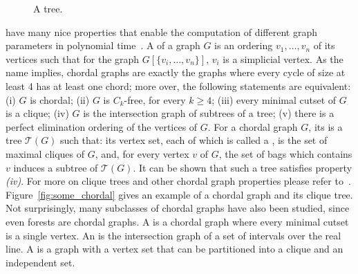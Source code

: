 \begin{figure}
    \centering
    \caption{A tree.}
    \label{fig:some_tree}
\end{figure}


 have many nice properties that enable the computation of different graph parameters in polynomial time~\citep{golumbic}. A  of a graph $G$ is an ordering $v_1, \dots, v_n$ of its vertices such that for the graph $G[\{v_i, \dots, v_n\}]$, $v_i$ is a simplicial vertex. As the name implies, chordal graphs are exactly the graphs where every cycle of size at least 4 has at least one chord; more over, the following statements are equivalent: (i) $G$ is chordal; (ii) $G$ is $C_k$-free, for every $k \geq 4$; (iii) every minimal cutset of $G$ is a clique; (iv) $G$ is the intersection graph of subtrees of a tree; (v) there is a perfect elimination ordering of the vertices of $G$.
For a chordal graph $G$, its  is a tree $\mathcal{T}(G)$ such that: its vertex set, each of which is called a , is the set of maximal cliques of $G$, and, for every vertex $v$ of $G$, the set of bags which contains $v$ induces a subtree of $\mathcal{T}(G)$. It can be shown that such a tree satisfies property \textit{(iv)}.
For more on clique trees and other chordal graph properties please refer to~\citep{clique_tree}.
Figure~\ref{fig:some_chordal} gives an example of a chordal graph and its clique tree.
Not surprisingly, many subclasses of chordal graphs have also been studied, since even forests are chordal graphs.
A  is a chordal graph where every minimal cutset is a single vertex.
An  is the intersection graph of a set of intervals over the real line.
A  is a graph with a vertex set that can be partitioned into a clique and an independent set.

